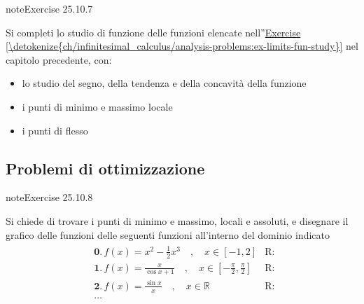 \documentclass[letterpaper,10pt,italian]{jupyterBook}
\begin{document}
\begin{sphinxadmonition}{note}{Exercise 25.10.7}



\sphinxAtStartPar
Si completi lo studio di funzione delle funzioni elencate nell”\hyperref[\detokenize{ch/infinitesimal_calculus/analysis-problems:ex-limits-fun-study}]{Exercise \ref{\detokenize{ch/infinitesimal_calculus/analysis-problems:ex-limits-fun-study}}} nel capitolo precedente, con:
\begin{itemize}
\item {} 
\sphinxAtStartPar
lo studio del segno, della tendenza e della concavità della funzione

\item {} 
\sphinxAtStartPar
i punti di minimo e massimo locale

\item {} 
\sphinxAtStartPar
i punti di flesso

\end{itemize}
\end{sphinxadmonition}


\subsection{Problemi di ottimizzazione}
\label{\detokenize{ch/infinitesimal_calculus/derivatives-problems:problemi-di-ottimizzazione}}\label{\detokenize{ch/infinitesimal_calculus/derivatives-problems:infinitesimal-calculus-derivatives-problems-opt}} \label{exercise:ch/infinitesimal_calculus/derivatives-problems-exercise-7}

\begin{sphinxadmonition}{note}{Exercise 25.10.8}



\sphinxAtStartPar
Si chiede di trovare i punti di minimo e massimo, locali e assoluti, e disegnare il grafico delle funzioni delle seguenti funzioni all’interno del dominio indicato
\begin{equation*}
\begin{split}\begin{aligned}
 & \mathbf{0.} \, f(x) = x^2 - \frac{1}{2} x^3 \quad , \quad x \in [-1,2] & \text{R: } \\
 & \mathbf{1.} \, f(x) = \frac{x}{\cos x + 1}  \quad , \quad x \in \left[ -\frac{\pi}{2}, \frac{\pi}{2} \right]  & \text{R: } \\
 & \mathbf{2.} \, f(x) = \frac{\sin{x}}{x} \quad , \quad x \in \mathbb{R} & \text{R: } \\
 & \dots 
\end{aligned}\end{split}
\end{equation*}
\sphinxAtStartPar
{} 
\end{sphinxadmonition}
 \label{exercise:ch/infinitesimal_calculus/derivatives-problems-exercise-8}
\end{document}
